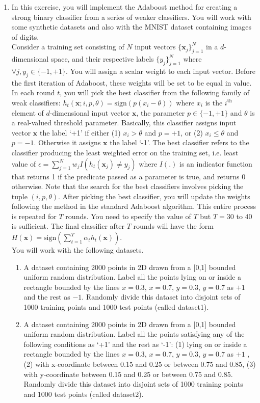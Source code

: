 \documentclass[11pt]{article}
\begin{document}
\begin{enumerate}
\item In this exercise, you will implement the Adaboost method for creating a strong binary classifier from a series of weaker classifiers. You will work with some synthetic datasets and also with the MNIST dataset containing images of digits.
\\
Consider a training set consisting of $N$ input vectors $\{\textbf{x}_j\}_{j=1}^{N}$ in a $d$-dimensional space, and their respective labels $\{y_j\}_{j=1}^N$ where $\forall j, y_j \in \{-1,+1\}$. You will assign a scalar weight to each input vector. Before the first iteration of Adaboost, these weights will be set to be equal in value. In each round $t$, you will pick the best classifier from the following family of weak classifiers: $h_t(\textbf{x}; i,p,\theta) = \textrm{sign}(p(x_i - \theta))$ where $x_i$ is the $i^{\textrm{th}}$ element of $d$-dimensional input vector $\textbf{x}$, the parameter $p \in \{-1,+1\}$ and $\theta$ is a real-valued threshold parameter. Basically, this classifier assigns input vector $\textbf{x}$ the label `+1' if either (1) $x_i > \theta$ and $p = +1$, or (2) $x_i \leq \theta$ and $p=-1$. Otherwise it assigns $\textbf{x}$ the label `-1'. The best classifier refers to the classifier producing the least weighted error on the training set, i.e. least value of $\epsilon = \sum_{j=1}^N w_j I(h_t(\textbf{x}_j) \neq y_j)$ where $I(.)$ is an indicator function that returns 1 if the predicate passed as a parameter is true, and returns 0 otherwise. Note that the search for the best classifiers involves picking the tuple $(i,p,\theta)$. After picking the best classifier, you will update the weights following the method in the standard Adaboost algorithm. This entire process is repeated for $T$ rounds. You need to specify the value of $T$ but $T = 30$ to $40$ is sufficient. The final classifier after $T$ rounds will have the form $H(\textbf{x}) = \textrm{sign}(\sum_{t=1}^{T} \alpha_t h_t(\textbf{x}))$. 
\\
You will work with the following datasets. 
\begin{enumerate}
\item A dataset containing 2000 points in 2D drawn from a [0,1] bounded uniform random distribution. Label all the points lying on or inside a rectangle bounded by the lines $x = 0.3$, $x = 0.7$, $y = 0.3$, $y= 0.7$ as $+1$ and the rest as $-1$. Randomly divide this dataset into disjoint sets of 1000 training points and 1000 test points (called dataset1). 
\item A dataset containing 2000 points in 2D drawn from a [0,1] bounded uniform random distribution. Label all the points satisfying any of the following conditions as `+1' and the rest as `-1': (1) lying on or inside a rectangle bounded by the lines $x = 0.3$, $x = 0.7$, $y = 0.3$, $y= 0.7$ as $+1$ , (2) with x-coordinate between 0.15 and 0.25 or between 0.75 and 0.85, (3) with y-coordinate between 0.15 and 0.25 or between 0.75 and 0.85. Randomly divide this dataset into disjoint sets of 1000 training points and 1000 test points (called dataset2). 

\end{enumerate}
\end{enumerate}
\end{document}

